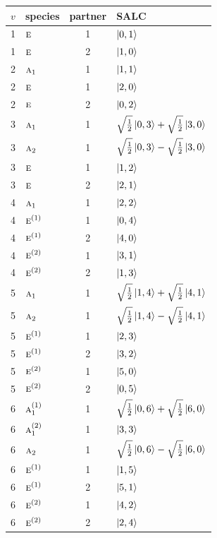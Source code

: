 \documentclass[11pt]{article}
\newcommand{\irr}[1]{\text{\normalfont\scshape #1}}
\begin{document}
\begin{longtable}{c l c p{}}\hline $v$ & species & partner & SALC\\ \hline\endhead
1 & $\irr{e}$ & 1 & $\ket{0,1}$\\
1 & $\irr{e}$ & 2 & $\ket{1,0}$\\
\hline
2 & $\irr{a}_{1}$ & 1 & $\ket{1,1}$\\
2 & $\irr{e}$ & 1 & $\ket{2,0}$\\
2 & $\irr{e}$ & 2 & $\ket{0,2}$\\
\hline
3 & $\irr{a}_{1}$ & 1 & $\sqrt{\tfrac{1}{2}}\ket{0,3}+\sqrt{\tfrac{1}{2}}\ket{3,0}$\\
3 & $\irr{a}_{2}$ & 1 & $\sqrt{\tfrac{1}{2}}\ket{0,3}-\sqrt{\tfrac{1}{2}}\ket{3,0}$\\
3 & $\irr{e}$ & 1 & $\ket{1,2}$\\
3 & $\irr{e}$ & 2 & $\ket{2,1}$\\
\hline
4 & $\irr{a}_{1}$ & 1 & $\ket{2,2}$\\
4 & $\irr{e}^{(1)}$ & 1 & $\ket{0,4}$\\
4 & $\irr{e}^{(1)}$ & 2 & $\ket{4,0}$\\
4 & $\irr{e}^{(2)}$ & 1 & $\ket{3,1}$\\
4 & $\irr{e}^{(2)}$ & 2 & $\ket{1,3}$\\
\hline
5 & $\irr{a}_{1}$ & 1 & $\sqrt{\tfrac{1}{2}}\ket{1,4}+\sqrt{\tfrac{1}{2}}\ket{4,1}$\\
5 & $\irr{a}_{2}$ & 1 & $\sqrt{\tfrac{1}{2}}\ket{1,4}-\sqrt{\tfrac{1}{2}}\ket{4,1}$\\
5 & $\irr{e}^{(1)}$ & 1 & $\ket{2,3}$\\
5 & $\irr{e}^{(1)}$ & 2 & $\ket{3,2}$\\
5 & $\irr{e}^{(2)}$ & 1 & $\ket{5,0}$\\
5 & $\irr{e}^{(2)}$ & 2 & $\ket{0,5}$\\
\hline
6 & $\irr{a}_{1}^{(1)}$ & 1 & $\sqrt{\tfrac{1}{2}}\ket{0,6}+\sqrt{\tfrac{1}{2}}\ket{6,0}$\\
6 & $\irr{a}_{1}^{(2)}$ & 1 & $\ket{3,3}$\\
6 & $\irr{a}_{2}$ & 1 & $\sqrt{\tfrac{1}{2}}\ket{0,6}-\sqrt{\tfrac{1}{2}}\ket{6,0}$\\
6 & $\irr{e}^{(1)}$ & 1 & $\ket{1,5}$\\
6 & $\irr{e}^{(1)}$ & 2 & $\ket{5,1}$\\
6 & $\irr{e}^{(2)}$ & 1 & $\ket{4,2}$\\
6 & $\irr{e}^{(2)}$ & 2 & $\ket{2,4}$\\
\hline
\end{longtable}
\end{document}
